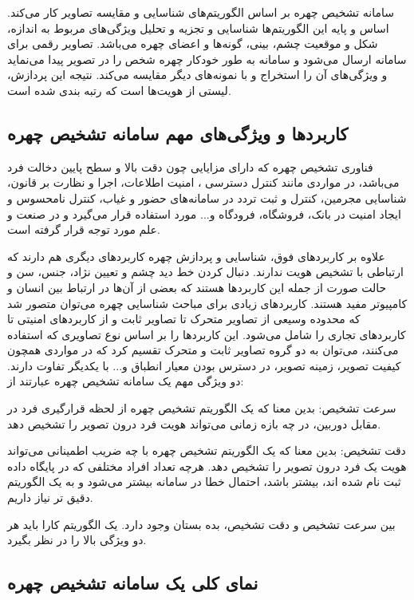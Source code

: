 سامانه تشخیص چهره بر اساس الگوریتم‌های شناسایی و مقایسه تصاویر کار می‌کند. اساس و پایه این الگوریتم‌ها شناسایی و تجزیه و تحلیل ویژگی‌های مربوط به اندازه، شکل و موقعیت چشم، بینی، گونه‌ها و اعضای چهره می‌باشد. تصاویر رقمی برای سامانه ارسال می‌شود و سامانه به طور خودکار چهره شخص را در تصویر پیدا می‌نماید و ویژگی‌های آن را استخراج و با نمونه‌های دیگر مقایسه می‌کند. نتیجه این پردازش، لیستی از هویت‌ها است که رتبه بندی شده است.

\subsection{کاربردها و ویژگی‌های مهم سامانه تشخیص چهره}

فناوری تشخیص چهره که دارای مزایایی چون دقت بالا و سطح پایین دخالت فرد می‌باشد، در مواردی مانند کنترل دسترسی ، امنیت اطلاعات، اجرا و نظارت بر قانون، شناسایی مجرمین، کنترل و ثبت تردد در سامانه‌های حضور و غیاب، کنترل نامحسوس و ایجاد امنیت در بانک، فروشگاه، فرودگاه و... مورد استفاده قرار می‌گیرد و در صنعت و علم مورد توجه قرار گرفته است.

\noindent
علاوه بر کاربردهای فوق، شناسایی و پردازش چهره کاربردهای دیگری هم دارند که ارتباطی با تشخیص هویت ندارند. دنبال کردن خط دید چشم و تعیین نژاد، جنس، سن و حالت صورت از جمله این کاربردها هستند که بعضی از آن‌ها در ارتباط بین انسان و کامپیوتر مفید هستند. کاربردهای زیادی برای مباحث شناسایی چهره می‌توان متصور شد که محدوده وسیعی از تصاویر متحرک تا تصاویر ثابت و از کاربردهای امنیتی تا کاربردهای تجاری را شامل می‌شود. این کاربردها را بر اساس نوع تصاویری که استفاده می‌کنند، می‌توان به دو گروه تصاویر ثابت و متحرک تقسیم کرد که در مواردی همچون کیفیت تصویر، زمینه تصویر، در دسترس بودن معیار انطباق و... با یکدیگر تفاوت دارند. دو ویژگی مهم یک سامانه تشخیص چهره عبارتند از:

\noindent
سرعت تشخیص: بدین معنا که یک الگوریتم تشخیص چهره از لحظه قرارگیری فرد در مقابل دوربین، در چه بازه زمانی می‌تواند هویت فرد درون تصویر را تشخیص دهد.

\noindent
دقت تشخیص: بدین معنا که یک الگوریتم تشخیص چهره با چه ضریب اطمینانی می‌تواند هویت یک فرد درون تصویر را تشخیص دهد. هرچه تعداد افراد مختلفی که در پایگاه داده ثبت نام شده اند، بیشتر باشد، احتمال خطا در سامانه بیشتر می‌شود و به یک الگوریتم دقیق تر نیاز داریم.

\noindent
بین سرعت تشخیص و دقت تشخیص، بده بستان  وجود دارد. یک الگوریتم کارا باید هر دو ویژگی بالا را در نظر بگیرد.

\subsection{نمای کلی یک سامانه تشخیص چهره}

